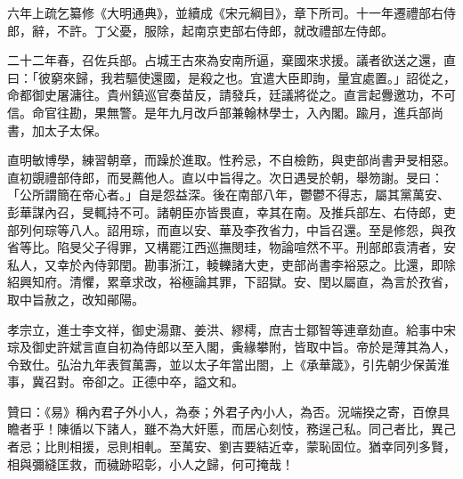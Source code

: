 \begin{pinyinscope}
六年上疏乞纂修《大明通典》，並續成《宋元綱目》，章下所司。十一年遷禮部右侍郎，辭，不許。丁父憂，服除，起南京吏部右侍郎，就改禮部左侍郎。

二十二年春，召佐兵部。占城王古來為安南所逼，棄國來求援。議者欲送之還，直曰：「彼窮來歸，我若驅使還國，是殺之也。宜遣大臣即詢，量宜處置。」詔從之，命都御史屠滽往。貴州鎮巡官奏苗反，請發兵，廷議將從之。直言起釁邀功，不可信。命官往勘，果無警。是年九月改戶部兼翰林學士，入內閣。踰月，進兵部尚書，加太子太保。

直明敏博學，練習朝章，而躁於進取。性矜忌，不自檢飭，與吏部尚書尹旻相惡。直初覬禮部侍郎，而旻薦他人。直以中旨得之。次日遇旻於朝，舉笏謝。旻曰：「公所謂簡在帝心者。」自是怨益深。後在南部八年，鬱鬱不得志，屬其黨萬安、彭華謀內召，旻輒持不可。諸朝臣亦皆畏直，幸其在南。及推兵部左、右侍郎，吏部列何琮等八人。詔用琮，而直以安、華及李孜省力，中旨召還。至是修怨，與孜省等比。陷旻父子得罪，又構罷江西巡撫閔珪，物論喧然不平。刑部郎袁清者，安私人，又幸於內侍郭閏。勘事浙江，輘轢諸大吏，吏部尚書李裕惡之。比還，即除紹興知府。清懼，累章求改，裕極論其罪，下詔獄。安、閏以屬直，為言於孜省，取中旨赦之，改知鄖陽。

孝宗立，進士李文祥，御史湯鼐、姜洪、繆樗，庶吉士鄒智等連章劾直。給事中宋琮及御史許斌言直自初為侍郎以至入閣，夤緣攀附，皆取中旨。帝於是薄其為人，令致仕。弘治九年表賀萬壽，並以太子年當出閤，上《承華箴》，引先朝少保黃淮事，冀召對。帝卻之。正德中卒，謚文和。

贊曰：《易》稱內君子外小人，為泰；外君子內小人，為否。況端揆之寄，百僚具瞻者乎！陳循以下諸人，雖不為大奸慝，而居心刻忮，務逞己私。同己者比，異己者忌；比則相援，忌則相軋。至萬安、劉吉要結近幸，蒙恥固位。猶幸同列多賢，相與彌縫匡救，而穢跡昭彰，小人之歸，何可掩哉！


\end{pinyinscope}
